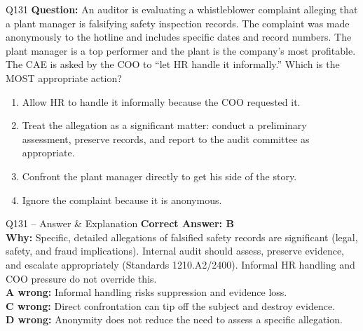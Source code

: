 \documentclass[aspectratio=169,10pt]{beamer}
\begin{document}
	\begin{frame}[t]{Q131}
		\small
		\textbf{Question:} An auditor is evaluating a whistleblower complaint alleging that a plant manager is falsifying safety inspection records. The complaint was made anonymously to the hotline and includes specific dates and record numbers. The plant manager is a top performer and the plant is the company's most profitable. The CAE is asked by the COO to ``let HR handle it informally.'' Which is the MOST appropriate action?
		\begin{enumerate}[label=\Alph*.,itemsep=1pt,topsep=2pt]
			\item Allow HR to handle it informally because the COO requested it.
			\item Treat the allegation as a significant matter: conduct a preliminary assessment, preserve records, and report to the audit committee as appropriate.
			\item Confront the plant manager directly to get his side of the story.
			\item Ignore the complaint because it is anonymous.
		\end{enumerate}
	\end{frame}
	
	\begin{frame}[t]{Q131 -- Answer \& Explanation}
		\small
		\textbf{Correct Answer: B} \\[4pt]
		\textbf{Why:} Specific, detailed allegations of falsified safety records are significant (legal, safety, and fraud implications). Internal audit should assess, preserve evidence, and escalate appropriately (Standards 1210.A2/2400). Informal HR handling and COO pressure do not override this. \\[4pt]
		\textbf{A wrong:} Informal handling risks suppression and evidence loss. \\[2pt]
		\textbf{C wrong:} Direct confrontation can tip off the subject and destroy evidence. \\[2pt]
		\textbf{D wrong:} Anonymity does not reduce the need to assess a specific allegation.
	\end{frame}
	
\end{document}
